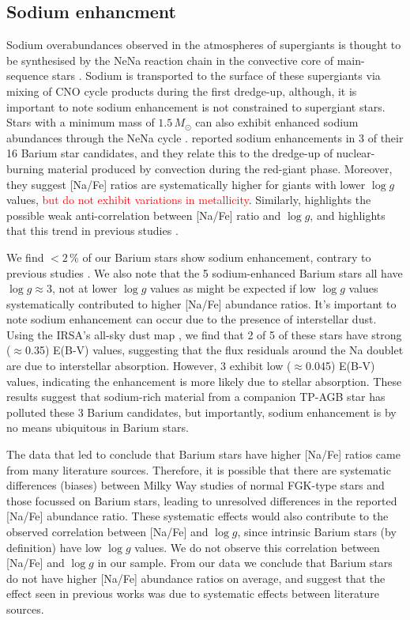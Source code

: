 \documentclass[a4paper,fleqn,usenatbib]{mnras}
\newcommand{\todo}[1]{\textcolor{red}{#1}}
\begin{document}
\subsection{Sodium enhancment}
Sodium overabundances observed in the atmospheres of supergiants is thought to be synthesised by the NeNa reaction chain in the convective core of main-sequence stars \citep{el1995}. Sodium is transported to the surface of these supergiants via mixing of CNO cycle products during the first dredge-up, although, it is important to note sodium enhancement is not constrained to supergiant stars. Stars with a  minimum mass of $1.5\,M_\odot$ can also exhibit enhanced sodium abundances through the NeNa cycle \citep{denissenkov1987}. \citet{antipova2004} reported sodium enhancements in 3 of their 16 Barium star candidates, and they relate this to the dredge-up of nuclear-burning material produced by convection during the red-giant phase. Moreover, they suggest [Na/Fe] ratios are systematically higher for giants with lower $\log{g}$ values, \todo{but do not exhibit variations in metallicity}. Similarly, \citet{decastro2016} highlights the possible weak anti-correlation between [Na/Fe] ratio and $\log{g}$, and highlights that this trend in previous studies \citep[e.g.,][]{boyarchuk2002,mishenina2006,luck2007,takeda2008}.

We find $<2$\,\% of our Barium stars show sodium enhancement, contrary to previous studies \citep[e.g.,][]{decastro2016}. We also note that the 5 sodium-enhanced Barium stars all have $\log{g} \approx 3$, not at lower $\log{g}$ values as might be expected if low $\log{g}$ values systematically contributed to higher [Na/Fe] abundance ratios. It's important to note sodium enhancement can occur due to the presence of interstellar dust. Using the IRSA's all-sky dust map \citep{schlafly2011}, we find that 2 of 5 of these stars have strong ($\approx$0.35) E(B-V) values, suggesting that the flux residuals around the Na doublet are due to interstellar absorption. However, 3 exhibit low ($\approx$0.045) E(B-V) values, indicating the enhancement is more likely due to stellar absorption. These results suggest that sodium-rich material from a companion TP-AGB star has polluted these 3 Barium candidates, but importantly, sodium enhancement is by no means ubiquitous in Barium stars. 

The data that led \citet{decastro2016} to conclude that Barium stars have higher [Na/Fe] ratios came from many literature sources. Therefore, it is possible that there are systematic differences (biases) between Milky Way studies of normal FGK-type stars and those focussed on Barium stars, leading to unresolved differences in the reported [Na/Fe] abundance ratio. These systematic effects would also contribute to the observed correlation between [Na/Fe] and $\log{g}$, since intrinsic Barium stars (by definition) have low $\log{g}$ values. We do not observe this correlation between [Na/Fe] and $\log{g}$ in our sample. From our data we conclude that Barium stars do not have higher [Na/Fe] abundance ratios on average, and suggest that the effect seen in previous works was due to systematic effects between literature sources.
\end{document}
